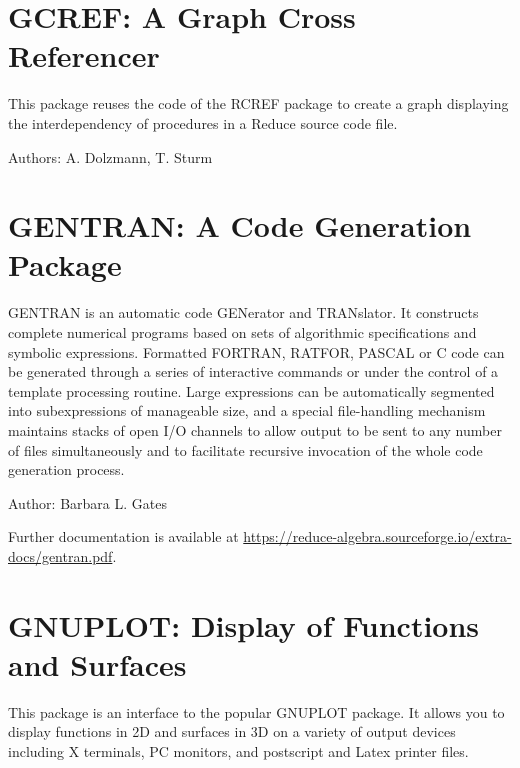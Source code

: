 \section{GCREF: A Graph Cross Referencer}
\label{GCREF}

This package reuses the code of the RCREF package to create a graph displaying
the interdependency of procedures in a Reduce source code file.

Authors: A. Dolzmann, T. Sturm



\newpage

\section{GENTRAN: A Code Generation Package}
\label{GENTRAN}


GENTRAN is an automatic code GENerator and TRANslator. It constructs
complete numerical programs based on sets of algorithmic specifications
and symbolic expressions. Formatted FORTRAN, RATFOR, PASCAL or C code can be
generated through a series of interactive commands or under the control of
a template processing routine. Large expressions can be automatically
segmented into subexpressions of manageable size, and a special
file-handling mechanism maintains stacks of open I/O channels to allow
output to be sent to any number of files simultaneously and to facilitate
recursive invocation of the whole code generation process.

Author: Barbara L. Gates

\begin{sloppypar}
  Further documentation is available at
  \url{https://reduce-algebra.sourceforge.io/extra-docs/gentran.pdf}.
\end{sloppypar}


\iffalse
\newpage

\section{GNUPLOT: Display of Functions and Surfaces}

This package is an interface to the popular GNUPLOT package.
It allows you to display functions in 2D and surfaces in 3D
on a variety of output devices including X terminals, PC monitors, and
postscript and Latex printer files.

